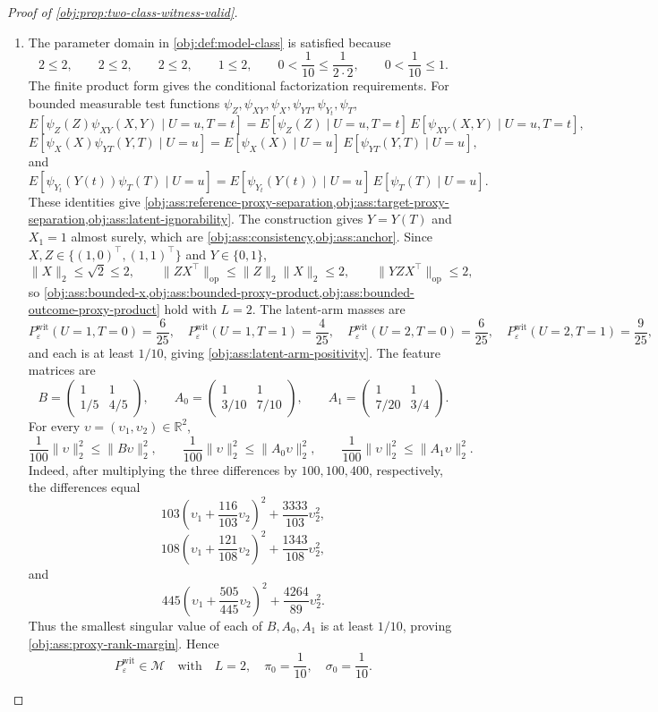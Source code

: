 \begin{proof}[Proof of \cref{obj:prop:two-class-witness-valid}]
\begin{enumerate}
\item The parameter domain in \cref{obj:def:model-class} is satisfied because
\[
2\le 2,\qquad 2\le 2,\qquad 2\le 2,\qquad
1\le 2,\qquad
0<\frac1{10}\le \frac1{2\cdot2},\qquad
0<\frac1{10}\le 1 .
\]
The finite product form gives the conditional factorization requirements.  For bounded measurable
test functions \(\psi_Z,\psi_{XY},\psi_X,\psi_{YT},\psi_{Y_t},\psi_T\),
\[
E[\psi_Z(Z)\psi_{XY}(X,Y)\mid U=u,T=t]
=
E[\psi_Z(Z)\mid U=u,T=t]\,
E[\psi_{XY}(X,Y)\mid U=u,T=t],
\]
\[
E[\psi_X(X)\psi_{YT}(Y,T)\mid U=u]
=
E[\psi_X(X)\mid U=u]\,
E[\psi_{YT}(Y,T)\mid U=u],
\]
and
\[
E[\psi_{Y_t}(Y(t))\psi_T(T)\mid U=u]
=
E[\psi_{Y_t}(Y(t))\mid U=u]\,
E[\psi_T(T)\mid U=u].
\]
These identities give \cref{obj:ass:reference-proxy-separation,obj:ass:target-proxy-separation,obj:ass:latent-ignorability}.  The construction gives \(Y=Y(T)\) and \(X_1=1\) almost surely, which are \cref{obj:ass:consistency,obj:ass:anchor}.  Since \(X,Z\in\{(1,0)^\top,(1,1)^\top\}\) and \(Y\in\{0,1\}\),
\[
\|X\|_2\le \sqrt2\le 2,\qquad
\|ZX^\top\|_{\mathrm{op}}\le \|Z\|_2\|X\|_2\le 2,\qquad
\|YZX^\top\|_{\mathrm{op}}\le 2,
\]
so \cref{obj:ass:bounded-x,obj:ass:bounded-proxy-product,obj:ass:bounded-outcome-proxy-product} hold with \(L=2\).  The latent-arm masses are
\[
P_{\varepsilon}^{\mathrm{wit}}(U=1,T=0)=\frac6{25},\quad
P_{\varepsilon}^{\mathrm{wit}}(U=1,T=1)=\frac4{25},\quad
P_{\varepsilon}^{\mathrm{wit}}(U=2,T=0)=\frac6{25},\quad
P_{\varepsilon}^{\mathrm{wit}}(U=2,T=1)=\frac9{25},
\]
and each is at least \(1/10\), giving \cref{obj:ass:latent-arm-positivity}.  The feature matrices are
\[
B=\begin{pmatrix}1&1\\[2pt]1/5&4/5\end{pmatrix},\qquad
A_0=\begin{pmatrix}1&1\\[2pt]3/10&7/10\end{pmatrix},\qquad
A_1=\begin{pmatrix}1&1\\[2pt]7/20&3/4\end{pmatrix}.
\]
For every \(\upsilon=(\upsilon_1,\upsilon_2)\in\mathbb R^2\),
\[
\frac1{100}\|\upsilon\|_2^2\le \|B\upsilon\|_2^2,\qquad
\frac1{100}\|\upsilon\|_2^2\le \|A_0\upsilon\|_2^2,\qquad
\frac1{100}\|\upsilon\|_2^2\le \|A_1\upsilon\|_2^2.
\]
Indeed, after multiplying the three differences by \(100,100,400\), respectively, the differences equal
\[
103\left(\upsilon_1+\frac{116}{103}\upsilon_2\right)^2
+\frac{3333}{103}\upsilon_2^2,
\]
\[
108\left(\upsilon_1+\frac{121}{108}\upsilon_2\right)^2
+\frac{1343}{108}\upsilon_2^2,
\]
and
\[
445\left(\upsilon_1+\frac{505}{445}\upsilon_2\right)^2
+\frac{4264}{89}\upsilon_2^2.
\]
Thus the smallest singular value of each of \(B,A_0,A_1\) is at least \(1/10\), proving \cref{obj:ass:proxy-rank-margin}.  Hence
\[
P_{\varepsilon}^{\mathrm{wit}}\in\mathcal M
\quad\text{with}\quad
L=2,\quad \pi_0=\frac1{10},\quad \sigma_0=\frac1{10}.
\] %


\end{enumerate}
\end{proof}

